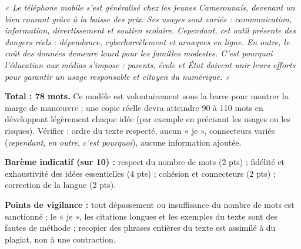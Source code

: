 \documentclass[11pt]{article}
\begin{document}
\begin{corrige}
\textit{« Le téléphone mobile s'est généralisé chez les jeunes Camerounais, devenant un bien courant grâce à la baisse des prix. Ses usages sont variés : communication, information, divertissement et soutien scolaire. Cependant, cet outil présente des dangers réels : dépendance, cyberharcèlement et arnaques en ligne. En outre, le coût des données demeure lourd pour les familles modestes. C'est pourquoi l'éducation aux médias s'impose : parents, école et État doivent unir leurs efforts pour garantir un usage responsable et citoyen du numérique. »}

\textbf{Total : 78 mots.} Ce modèle est volontairement sous la barre pour montrer la marge de manœuvre ; une copie réelle devra atteindre 90 à 110 mots en développant légèrement chaque idée (par exemple en précisant les usages ou les risques). Vérifier : ordre du texte respecté, aucun « je », connecteurs variés (\emph{cependant}, \emph{en outre}, \emph{c'est pourquoi}), aucune information ajoutée.

\textbf{Barème indicatif (sur 10) :} respect du nombre de mots (2 pts) ; fidélité et exhaustivité des idées essentielles (4 pts) ; cohésion et connecteurs (2 pts) ; correction de la langue (2 pts).

\textbf{Points de vigilance :} tout dépassement ou insuffisance du nombre de mots est sanctionné ; le « je », les citations longues et les exemples du texte sont des fautes de méthode ; recopier des phrases entières du texte est assimilé à du plagiat, non à une contraction.
\end{corrige}
\end{document}
